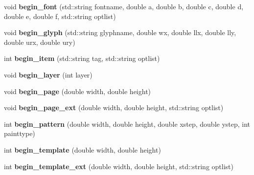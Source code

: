 \begin{DoxyCompactItemize}
\item 
\hypertarget{classPDFlib_a3f8a5ee80b6c632c1687e3100ef4a1bb}{void {\bfseries begin\-\_\-font} (std\-::string fontname, double a, double b, double c, double d, double e, double f, std\-::string optlist)}\label{classPDFlib_a3f8a5ee80b6c632c1687e3100ef4a1bb}

\item 
\hypertarget{classPDFlib_adeb917523298b8df07d5a0161dca81ca}{void {\bfseries begin\-\_\-glyph} (std\-::string glyphname, double wx, double llx, double lly, double urx, double ury)}\label{classPDFlib_adeb917523298b8df07d5a0161dca81ca}

\item 
\hypertarget{classPDFlib_a0df23d2d6f9a6a100878bad9b8936e6c}{int {\bfseries begin\-\_\-item} (std\-::string tag, std\-::string optlist)}\label{classPDFlib_a0df23d2d6f9a6a100878bad9b8936e6c}

\item 
\hypertarget{classPDFlib_ac35bac599211da4f97c13bf5d752ca4f}{void {\bfseries begin\-\_\-layer} (int layer)}\label{classPDFlib_ac35bac599211da4f97c13bf5d752ca4f}

\item 
\hypertarget{classPDFlib_a311dccd5a1ac04646673e6eaeea476ae}{void {\bfseries begin\-\_\-page} (double width, double height)}\label{classPDFlib_a311dccd5a1ac04646673e6eaeea476ae}

\item 
\hypertarget{classPDFlib_ac656d2651dab7cd9dc27e6fb7e24674b}{void {\bfseries begin\-\_\-page\-\_\-ext} (double width, double height, std\-::string optlist)}\label{classPDFlib_ac656d2651dab7cd9dc27e6fb7e24674b}

\item 
\hypertarget{classPDFlib_a4f448cf3fb5e4376c8f5665b209309b2}{int {\bfseries begin\-\_\-pattern} (double width, double height, double xstep, double ystep, int painttype)}\label{classPDFlib_a4f448cf3fb5e4376c8f5665b209309b2}

\item 
\hypertarget{classPDFlib_a0a17dc423a0b09f0fe3da38184a0c58a}{int {\bfseries begin\-\_\-template} (double width, double height)}\label{classPDFlib_a0a17dc423a0b09f0fe3da38184a0c58a}

\item 
\hypertarget{classPDFlib_af52208d3c75b94fa260e930379add01e}{int {\bfseries begin\-\_\-template\-\_\-ext} (double width, double height, std\-::string optlist)}\label{classPDFlib_af52208d3c75b94fa260e930379add01e}


\end{DoxyCompactItemize}
